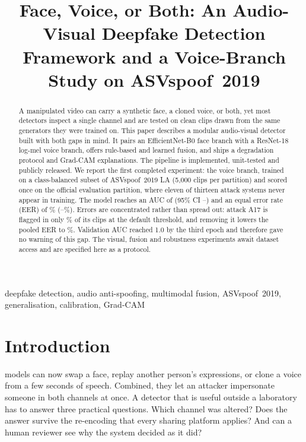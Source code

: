 \documentclass[conference]{IEEEtran}
\begin{document}
\title{Face, Voice, or Both: An Audio-Visual Deepfake Detection Framework and a Voice-Branch Study on ASVspoof~2019}

\author{
}

\maketitle

\begin{abstract}
A manipulated video can carry a synthetic face, a cloned voice, or both, yet most detectors inspect a single channel and are tested on clean clips drawn from the same generators they were trained on. This paper describes a modular audio-visual detector built with both gaps in mind. It pairs an EfficientNet-B0 face branch with a ResNet-18 log-mel voice branch, offers rule-based and learned fusion, and ships a degradation protocol and Grad-CAM explanations. The pipeline is implemented, unit-tested and publicly released. We report the first completed experiment: the voice branch, trained on a class-balanced subset of ASVspoof~2019 LA (5{,}000 clips per partition) and scored once on the official evaluation partition, where eleven of thirteen attack systems never appear in training. The model reaches an AUC of \AUC{} (95\% CI \AUClo--\AUChi) and an equal error rate (EER) of \EER\% (\EERlo--\EERhi\%). Errors are concentrated rather than spread out: attack A17 is flagged in only \DetAsev\% of its clips at the default threshold, and removing it lowers the pooled EER to \EERexcl\%. Validation AUC reached 1.0 by the third epoch and therefore gave no warning of this gap. The visual, fusion and robustness experiments await dataset access and are specified here as a protocol.
\end{abstract}

\begin{IEEEkeywords}
deepfake detection, audio anti-spoofing, multimodal fusion, ASVspoof~2019, generalisation, calibration, Grad-CAM
\end{IEEEkeywords}

\section{Introduction}
 models can now swap a face, replay another person's expressions, or clone a voice from a few seconds of speech. Combined, they let an attacker impersonate someone in both channels at once. A detector that is useful outside a laboratory has to answer three practical questions. Which channel was altered? Does the answer survive the re-encoding that every sharing platform applies? And can a human reviewer see why the system decided as it did?
\end{document}
